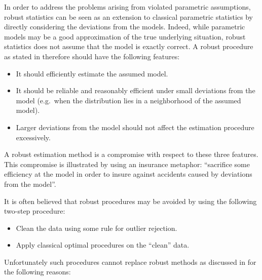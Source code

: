 \documentclass[]{book}
\providecommand{\tightlist}{%
  \setlength{\itemsep}{0pt}\setlength{\parskip}{0pt}}
\theoremstyle{definition}
\theoremstyle{definition}
\theoremstyle{definition}
\theoremstyle{remark}
\begin{document}
In order to address the problems arising from violated parametric
assumptions, robust statistics can be seen as an extension to classical
parametric statistics by directly considering the deviations from the
models. Indeed, while parametric models may be a good approximation of
the true underlying situation, robust statistics does not assume that
the model is exactly correct. A robust procedure as stated in
\citet{huber2009robust} therefore should have the following features:

\begin{itemize}
\tightlist
\item
  It should efficiently estimate the assumed model.
\item
  It should be reliable and reasonably efficient under small deviations
  from the model (e.g.~when the distribution lies in a neighborhood of
  the assumed model).
\item
  Larger deviations from the model should not affect the estimation
  procedure excessively.
\end{itemize}

A robust estimation method is a compromise with respect to these three
features. This compromise is illustrated by
\citet{anscombe1960rejection} using an insurance metaphor: ``sacrifice
some efficiency at the model in order to insure against accidents caused
by deviations from the model''.

It is often believed that robust procedures may be avoided by using the
following two-step procedure:

\begin{itemize}
\tightlist
\item
  Clean the data using some rule for outlier rejection.
\item
  Apply classical optimal procedures on the ``clean'' data.
\end{itemize}

Unfortunately such procedures cannot replace robust methods as discussed
in \citet{huber2009robust} for the following reasons:
\end{document}
